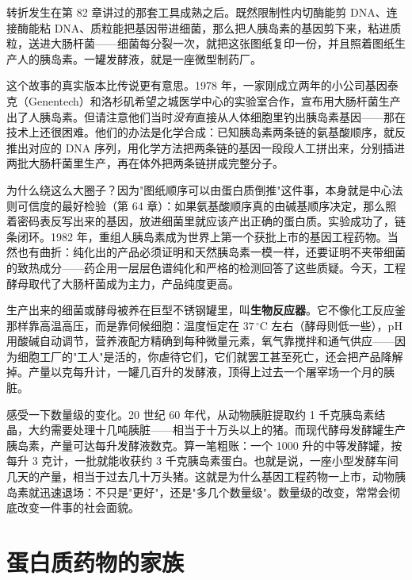 转折发生在第 82 章讲过的那套工具成熟之后。既然限制性内切酶能剪 DNA、连接酶能粘 DNA、质粒能把基因带进细菌，那么把人胰岛素的基因剪下来，粘进质粒，送进大肠杆菌——细菌每分裂一次，就把这张图纸复印一份，并且照着图纸生产人的胰岛素。一罐发酵液，就是一座微型制药厂。

\begin{zhengju}
这个故事的真实版本比传说更有意思。1978 年，一家刚成立两年的小公司基因泰克（Genentech）和洛杉矶希望之城医学中心的实验室合作，宣布用大肠杆菌生产出了人胰岛素。但请注意他们当时\emph{没有}直接从人体细胞里钓出胰岛素基因——那在技术上还很困难。他们的办法是化学合成：已知胰岛素两条链的氨基酸顺序，就反推出对应的 DNA 序列，用化学方法把两条链的基因一段段人工拼出来，分别插进两批大肠杆菌里生产，再在体外把两条链拼成完整分子。

为什么绕这么大圈子？因为"图纸顺序可以由蛋白质倒推"这件事，本身就是中心法则可信度的最好检验（第 64 章）：如果氨基酸顺序真的由碱基顺序决定，那么照着密码表反写出来的基因，放进细菌里就应该产出正确的蛋白质。实验成功了，链条闭环。1982 年，重组人胰岛素成为世界上第一个获批上市的基因工程药物。当然也有曲折：纯化出的产品必须证明和天然胰岛素一模一样，还要证明不夹带细菌的致热成分——药企用一层层色谱纯化和严格的检测回答了这些质疑。今天，工程酵母取代了大肠杆菌成为主力，产品纯度更高。
\end{zhengju}

生产出来的细菌或酵母被养在巨型不锈钢罐里，叫\textbf{生物反应器}。它不像化工反应釜那样靠高温高压，而是靠伺候细胞：温度恒定在 $37\,^{\circ}\mathrm{C}$ 左右（酵母则低一些），pH 用酸碱自动调节，营养液配方精确到每种微量元素，氧气靠搅拌和通气供应——因为细胞工厂的"工人"是活的，你虐待它们，它们就罢工甚至死亡，还会把产品降解掉。产量以克每升计，一罐几百升的发酵液，顶得上过去一个屠宰场一个月的胰脏。

\begin{qiaoliang}
感受一下数量级的变化。20 世纪 60 年代，从动物胰脏提取约 1 千克胰岛素结晶，大约需要处理十几吨胰脏——相当于十万头以上的猪。而现代酵母发酵罐生产胰岛素，产量可达每升发酵液数克。算一笔粗账：一个 1000 升的中等发酵罐，按每升 3 克计，一批就能收获约 3 千克胰岛素蛋白。也就是说，一座小型发酵车间几天的产量，相当于过去几十万头猪。这就是为什么基因工程药物一上市，动物胰岛素就迅速退场：不只是"更好"，还是"多几个数量级"。数量级的改变，常常会彻底改变一件事的社会面貌。
\end{qiaoliang}

\section{蛋白质药物的家族}

